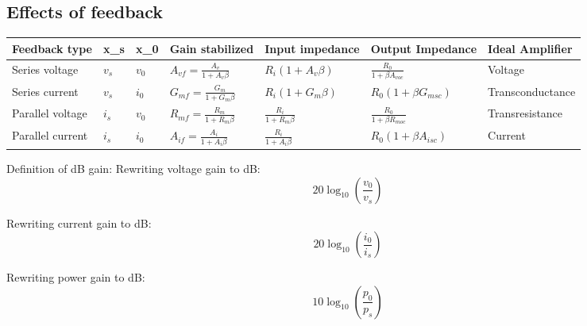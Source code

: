 \subsection{Effects of feedback}
\begin{table}[!ht]
	\centering
	\begin{adjustbox}{width=\textwidth}
		\begin{tabular}{|l|l|l|l|l|l|l|}
			\hline
			Feedback type    & x\_s  & x\_0  & Gain stabilized                    & Input impedance           & Output Impedance              & Ideal Amplifier  \\ \hline
			Series voltage   & $v_s$ & $v_0$ & $A_{vf} = \frac{A_v}{1+A_v \beta}$ & $R_i(1+A_v\beta)$         & $\frac{R_0}{1+\beta A_{voc}}$ & Voltage          \\ \hline
			Series current   & $v_s$ & $i_0$ & $G_{mf}=\frac{G_m}{1+G_m \beta}$   & $R_i(1+G_m \beta)$        & $R_0(1+\beta G_{msc})$        & Transconductance \\ \hline
			Parallel voltage & $i_s$ & $v_0$ & $R_{mf} = \frac{R_m}{1+R_m \beta}$ & $\frac{R_i}{1+R_m \beta}$ & $\frac{R_0}{1+\beta R_{moc}}$ & Transresistance  \\ \hline
			Parallel current & $i_s$ & $i_0$ & $A_{if}=\frac{A_i}{1+A_i \beta}$   & $\frac{R_i}{1+A_i \beta}$ & $R_0(1+\beta A_{isc})$        & Current          \\ \hline
		\end{tabular}
	\end{adjustbox}
\end{table}

Definition of dB gain:
Rewriting voltage gain to dB:
$$20\log_{10}(\frac{v_0}{v_s})$$

Rewriting current gain to dB:
$$20\log_{10}(\frac{i_0}{i_s})$$

Rewriting power gain to dB:
$$10\log_{10}(\frac{p_0}{p_s})$$


